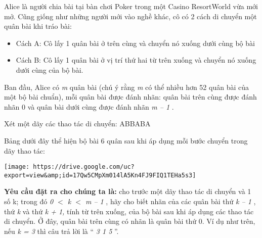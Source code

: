 Alice là người chia bài tại bàn chơi Poker trong một Casino ResortWorld vừa mới mở. Cũng giống như những người mới vào nghề khác, cô có 2 cách di chuyển một quân bài khi tráo bài:
\begin{itemize}
	\item Cách A: Cô lấy 1 quân bài ở trên cùng và chuyển nó xuống dưới cùng bộ bài
	\item Cách B: Cô lấy 1 quân bài ở vị trí thứ hai từ trên xuống và chuyển nó xuống dưới cùng của bộ bài.
\end{itemize}

Ban đầu, Alice có \emph{ m } quân bài (chú ý rằng \emph{ m } có thể nhiều hơn 52 quân bài của một bộ bài chuẩn), mỗi quân bài được đánh nhãn: quân bài trên cùng được đánh nhãn 0 và quân bài dưới cùng được đánh nhãn \emph{ m – 1 } .

Xét một dãy các thao tác di chuyển: ABBABA

Bảng dưới đây thể hiện bộ bài 6 quân sau khi áp dụng mỗi bước chuyển trong dãy thao tác:


\texttt{[image: https://drive.google.com/uc?export=view\&amp;id=17Qw5CMpXm014lA5Kn4FJ9FIQ1TEHa5s3]}

\textbf{Yêu cầu đặt ra cho chúng ta là: } cho trước một dãy thao tác di chuyển và 1 số k; trong đó \emph{ 0 $<$ k $<$ m – 1 } , hãy cho biết nhãn của các quân bài thứ \emph{ k – 1 } , thứ \emph{ k } và thứ \emph{ k + 1, } tính từ trên xuống, của bộ bài sau khi áp dụng các thao tác di chuyển. Ở đây, quân bài trên cùng có nhãn là quân bài thứ 0. Ví dụ như trên, nếu \emph{ k = 3 } thì câu trả lời là “ \emph{ 3 1 5 } ”.